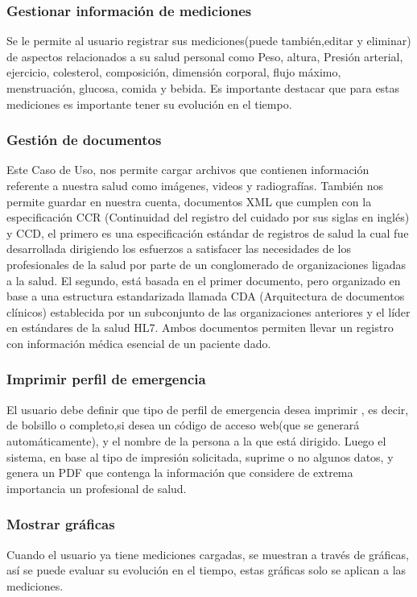 {\subsubsection{Gestionar información de mediciones}
Se le permite al usuario registrar sus mediciones(puede también,editar y eliminar) de aspectos relacionados a su salud personal como Peso, altura, Presión arterial, ejercicio, colesterol, composición, dimensión corporal, flujo máximo, menstruación, glucosa, comida y bebida. Es importante destacar que para estas mediciones es importante tener su evolución en el tiempo.

\subsubsection{Gestión de documentos}
	Este Caso de Uso, nos permite cargar archivos que contienen información referente a nuestra salud como imágenes, videos y radiografías. También nos permite guardar en nuestra cuenta, documentos XML que cumplen con la especificación CCR (Continuidad del registro del cuidado por sus siglas en inglés) y CCD, el primero es una especificación estándar de registros de salud la cual fue desarrollada dirigiendo los esfuerzos a satisfacer las necesidades de los profesionales de la salud por parte de un conglomerado de organizaciones ligadas a la salud. El segundo, está basada  en el primer documento, pero organizado en base a una estructura estandarizada llamada CDA (Arquitectura de documentos clínicos) establecida por un subconjunto de las organizaciones anteriores y el líder en estándares de la salud HL7. Ambos documentos permiten llevar un registro con información médica esencial de un paciente dado.
    
\subsubsection{Imprimir perfil de emergencia}
El usuario debe definir que tipo de perfil de emergencia desea imprimir , es decir, de bolsillo o completo,si desea un código de acceso web(que se generará automáticamente), y el nombre de la persona a la que está dirigido. Luego el sistema, en base al tipo de impresión solicitada, suprime o no algunos datos, y genera un PDF que contenga la información que considere de extrema importancia un profesional de salud.

\subsubsection{Mostrar gráficas}
Cuando el usuario ya tiene mediciones cargadas, se muestran a través de gráficas, así se puede evaluar su evolución en el tiempo, estas gráficas solo se aplican a las mediciones.

}
